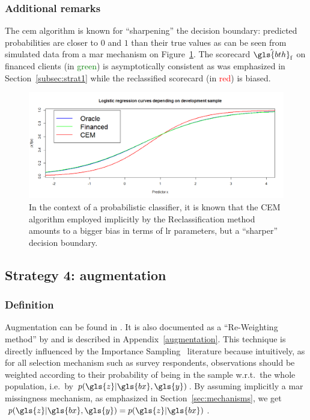 \subsubsection{Additional remarks}
The \gls{cem} algorithm is known for ``sharpening'' the decision boundary: predicted probabilities are closer to $0$ and $1$ than their true values as can be seen from simulated data from a \gls{mar} mechanism on Figure~\ref{fig:biais_CEM}. The scorecard $\hat{\gls{bth}}_{\text{f}}$ on financed clients (in \textcolor{green}{green}) is asymptotically consistent as was emphasized in Section~\ref{subsec:strat1} while the reclassified scorecard (in \textcolor{red}{red}) is biased.

\begin{figure}[ht]
\center \includegraphics[width=\textwidth]{figures/chapitre2/CEM_bias.png}
\caption{In the context of a probabilistic classifier, it is known that the CEM algorithm employed implicitly by the Reclassification method amounts to a bigger bias in terms of \gls{lr} parameters, but a ``sharper'' decision boundary.}
\label{fig:biais_CEM}
\end{figure}


\subsection{Strategy 4: augmentation} \label{subsec:augmentation}

\subsubsection{Definition}
Augmentation can be found in \cite{RI6}. It is also documented as a ``Re-Weighting method'' by \cite{saporta,banasik,economix} and is described in Appendix~\ref{augmentation}. This technique is directly influenced by the Importance Sampling~\cite{zadrozny2004learning} literature because intuitively, as for all selection mechanism such as survey respondents, observations should be weighted according to their probability of being in the sample w.r.t.\ the whole population, i.e.\ by $p(\gls{z} | \gls{bx},\gls{y})$. By assuming implicitly a \gls{mar} missingness mechanism, as emphasized in Section~\ref{sec:mechanisms}, we get $p(\gls{z} | \gls{bx}, \gls{y}) = p(\gls{z} | \gls{bx})$. 

